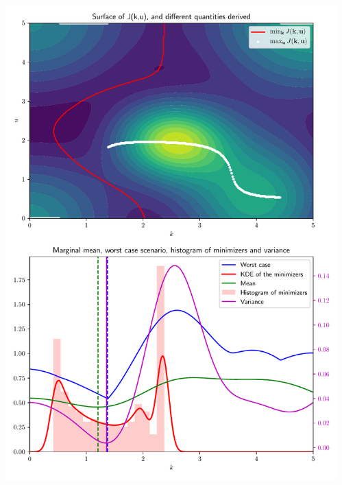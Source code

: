 \documentclass[11pt]{beamer}
\newcommand{\Prob}{\mathbb{P}}
\begin{document}
{\begin{columns}
\begin{column}{0.6\textwidth}
                  \end{column}%
                  \begin{column}{0.5\textwidth}
                    \begin{center}
                      \includegraphics[scale=0.3]{summary_criteria}
                    \end{center}
                  \end{column}
                \end{columns}
              }
\end{document}
